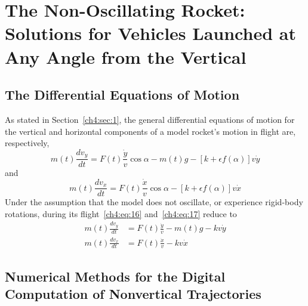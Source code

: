 \section{The Non-Oscillating Rocket: Solutions for Vehicles Launched at Any Angle from the
Vertical}\label{ch4:sec:3}

\subsection{The Differential Equations of Motion}\label{ch4:sec:3.1}

As stated in Section~\ref{ch4:sec:1}, the general differential equations of motion for the vertical
and horizontal components of a model rocket's motion in flight are, respectively,
\begin{equation*}
m(t)\frac{dv_y}{dt} = F(t)\frac{\dot{y}}{v}\cos\alpha - m(t)g - [k + \epsilon f(\alpha)]v\dot{y}
  \tag{16}
\end{equation*}
and
\begin{equation*}
m(t)\frac{dv_x}{dt} = F(t)\frac{\dot{x}}{v}\cos\alpha - [k + \epsilon f(\alpha)]v\dot{x} \tag{17}
\end{equation*}
Under the assumption that the model does not oscillate, or experience rigid-body rotations, during
its flight~\eqref{ch4:eq:16} and~\eqref{ch4:eq:17} reduce to
\begin{align}
m(t)\frac{dv_y}{dt} &= F(t)\frac{\dot{y}}{v} - m(t)g - kv\dot{y} \label{ch4:eq:90}\\
m(t)\frac{dv_x}{dt} &= F(t)\frac{\dot{x}}{v} - kv\dot{x} \label{ch4:eq:91}
\end{align}

\subsection{Numerical Methods for the Digital Computation of Nonvertical
Trajectories}\label{ch4:sec:3.2}

